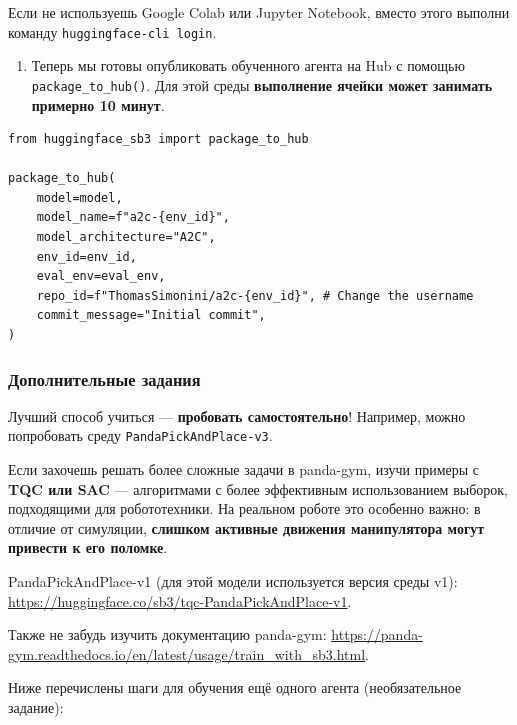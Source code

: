 \documentclass[11pt,a4paper]{article}
\begin{document}
Если не используешь Google Colab или Jupyter Notebook, вместо этого выполни команду \texttt{huggingface-cli\ login}.

\begin{enumerate}
\def\labelenumi{\arabic{enumi}.}
\setcounter{enumi}{2}
\tightlist
\item
  Теперь мы готовы опубликовать обученного агента на Hub с помощью \texttt{package\_to\_hub()}. Для этой среды \textbf{выполнение ячейки может занимать примерно 10 минут}.
\end{enumerate}

\begin{lstlisting}
from huggingface_sb3 import package_to_hub

package_to_hub(
    model=model,
    model_name=f"a2c-{env_id}",
    model_architecture="A2C",
    env_id=env_id,
    eval_env=eval_env,
    repo_id=f"ThomasSimonini/a2c-{env_id}", # Change the username
    commit_message="Initial commit",
)
\end{lstlisting}

\subsubsection{Дополнительные задания}\label{some-additional-challenges}

Лучший способ учиться --- \textbf{пробовать самостоятельно}! Например, можно попробовать среду \texttt{PandaPickAndPlace-v3}.

Если захочешь решать более сложные задачи в panda-gym, изучи примеры с \textbf{TQC или SAC} --- алгоритмами с более эффективным использованием выборок, подходящими для робототехники. На реальном роботе это особенно важно: в отличие от симуляции, \textbf{слишком активные движения манипулятора могут привести к его поломке}.

PandaPickAndPlace-v1 (для этой модели используется версия среды v1): \url{https://huggingface.co/sb3/tqc-PandaPickAndPlace-v1}.

Также не забудь изучить документацию panda-gym: \url{https://panda-gym.readthedocs.io/en/latest/usage/train_with_sb3.html}.

Ниже перечислены шаги для обучения ещё одного агента (необязательное задание):
\end{document}
